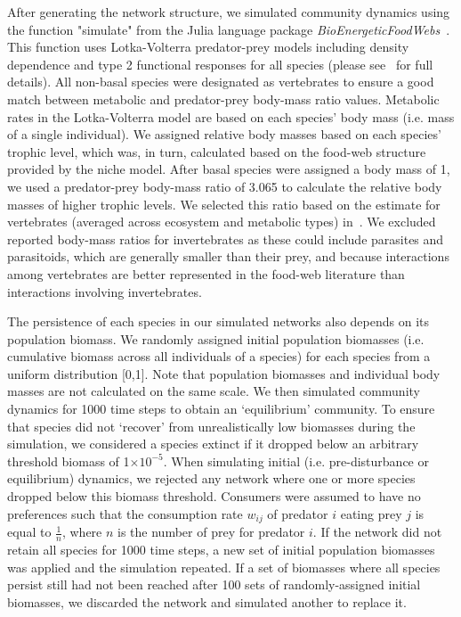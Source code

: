 \documentclass[12pt]{article}
\begin{document}
\begin{spacing}{2.0}
	After generating the network structure, we simulated community dynamics using the function "simulate" from the Julia language package \emph{BioEnergeticFoodWebs}~\citep{bioenergeticfw,Delmas2017}. This function uses Lotka-Volterra predator-prey models including density dependence and type 2 functional responses for all species (please see~\citet{Delmas2017} for full details).
	All non-basal species were designated as vertebrates to ensure a good match between metabolic and predator-prey body-mass ratio values. Metabolic rates in the Lotka-Volterra model are based on each species' body mass (i.e. mass of a single individual). We assigned relative body masses based on each species' trophic level, which was, in turn, calculated based on the food-web structure provided by the niche model. After basal species were assigned a body mass of 1, we used a predator-prey body-mass ratio of 3.065 to calculate the relative body masses of higher trophic levels. We selected this ratio based on the estimate for vertebrates (averaged across ecosystem and metabolic types) in~\citet{Brose2006}. We excluded reported body-mass ratios for invertebrates as these could include parasites and parasitoids, which are generally smaller than their prey, and because interactions among vertebrates are better represented in the food-web literature than interactions involving invertebrates.
	
	
	The persistence of each species in our simulated networks also depends on its population biomass. 
	We randomly assigned initial population biomasses (i.e. cumulative biomass across all individuals of a species) for each species from a uniform distribution [0,1]. Note that population biomasses and individual body masses are not calculated on the same scale. We then simulated community dynamics for 1000 time steps to obtain an `equilibrium' community. To ensure that species did not `recover' from unrealistically low biomasses during the simulation, we considered a species extinct if it dropped below an arbitrary threshold biomass of 1$\times10^{-5}$. When simulating initial (i.e. pre-disturbance or equilibrium) dynamics, we rejected any network where one or more species dropped below this biomass threshold. Consumers were assumed to have no preferences such that the consumption rate $w_{ij}$ of predator $i$ eating prey $j$ is equal to $\frac{1}{n}$, where $n$ is the number of prey for predator $i$. If the network did not retain all species for 1000 time steps, a new set of initial population biomasses was applied and the simulation repeated.
	If a set of biomasses where all species persist still had not been reached after 100 sets of randomly-assigned initial biomasses, we discarded the network and simulated another to replace it.



\end{spacing}
\end{document}

